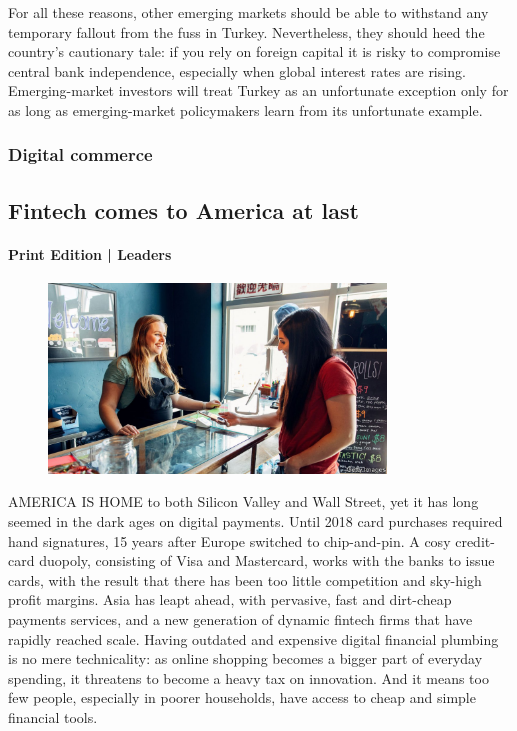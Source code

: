 \documentclass{article}
\begin{document}
For all these reasons, other emerging markets should be able to withstand any temporary fallout from the fuss in Turkey. Nevertheless, they should heed the country's cautionary tale: if you rely on foreign capital it is risky to compromise central bank independence, especially when global interest rates are rising. Emerging-market investors will treat Turkey as an unfortunate exception only for as long as emerging-market policymakers learn from its unfortunate example. {} 
\clearpage
\subsubsection{Digital commerce }
\subsection{Fintech comes to America at last }
\paragraph{Print Edition | Leaders  \quad \color{gray}{Mar 27th 2021 }}
\begin{figure}[h]
\centering
\includegraphics[width=0.8\textwidth]{images/20210327_ldp502.jpg}
\end{figure}
\lettrine{A}MERICA IS HOME to both Silicon Valley and Wall Street, yet it has long seemed in the dark ages on digital payments. Until 2018 card purchases required hand signatures, 15 years after Europe switched to chip-and-pin. A cosy credit-card duopoly, consisting of Visa and Mastercard, works with the banks to issue cards, with the result that there has been too little competition and sky-high profit margins. Asia has leapt ahead, with pervasive, fast and dirt-cheap payments services, and a new generation of dynamic fintech firms that have rapidly reached scale. Having outdated and expensive digital financial plumbing is no mere technicality: as online shopping becomes a bigger part of everyday spending, it threatens to become a heavy tax on innovation. And it means too few people, especially in poorer households, have access to cheap and simple financial tools. 
\end{document}
